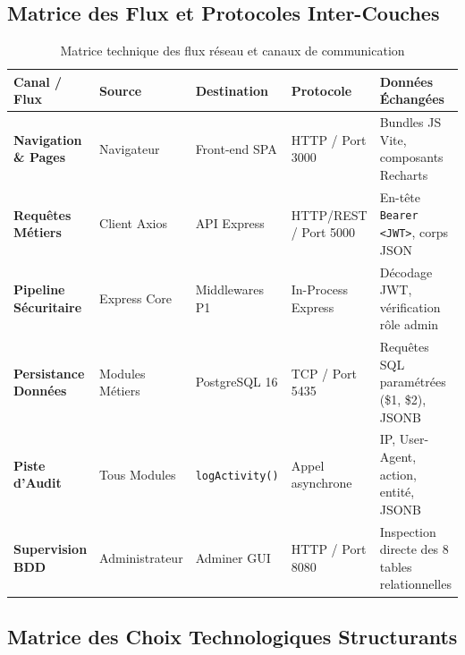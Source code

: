 \documentclass[11pt,a4paper]{article}
\begin{document}
\subsection{Matrice des Flux et Protocoles Inter-Couches}

\begin{table}[h!]
\centering
\small
\renewcommand{\arraystretch}{1.2}
\begin{tabularx}{\textwidth}{>{\bfseries}p{3.2cm} p{2.2cm} p{2.5cm} p{3.2cm} X}
    \toprule
    \rowcolor{tableheader}
    \color{white}Canal / Flux & \color{white}Source & \color{white}Destination & \color{white}Protocole & \color{white}Données Échangées \\
    \midrule
    Navigation \& Pages & Navigateur & Front-end SPA & HTTP / Port 3000 & Bundles JS Vite, composants Recharts \\
    \rowcolor{tablerowalt}
    Requêtes Métiers & Client Axios & API Express & HTTP/REST / Port 5000 & En-tête \texttt{Bearer <JWT>}, corps JSON \\
    Pipeline Sécuritaire & Express Core & Middlewares P1 & In-Process Express & Décodage JWT, vérification rôle admin \\
    \rowcolor{tablerowalt}
    Persistance Données & Modules Métiers & PostgreSQL 16 & TCP / Port 5435 & Requêtes SQL paramétrées (\$1, \$2), JSONB \\
    Piste d'Audit & Tous Modules & \texttt{logActivity()} & Appel asynchrone & IP, User-Agent, action, entité, JSONB \\
    \rowcolor{tablerowalt}
    Supervision BDD & Administrateur & Adminer GUI & HTTP / Port 8080 & Inspection directe des 8 tables relationnelles \\
    \bottomrule
\end{tabularx}
\caption{Matrice technique des flux réseau et canaux de communication}
\end{table}

\subsection{Matrice des Choix Technologiques Structurants}
\end{document}
